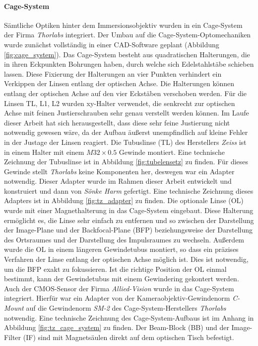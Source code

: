 \documentclass[titlepage,  ngerman]{article}
\begin{document}
	\paragraph{Cage-System}
	Sämtliche Optiken hinter dem Immersionsobjektiv wurden in ein Cage-System der Firma \textit{Thorlabs} integriert. Der Umbau auf die Cage-System-Optomechaniken wurde zunächst vollständig in einer CAD-Software geplant (Abbildung \ref{fig:cage_system}). Das Cage-System besteht aus quadratischen Halterungen, die in ihren Eckpunkten Bohrungen haben, durch welche sich Edelstahlstäbe schieben lassen. Diese Fixierung der Halterungen an vier Punkten verhindert ein Verkippen der Linsen entlang der optischen Achse. Die Halterungen können entlang der optischen Achse auf den vier Eckstäben verschoben werden. Für die  Linsen TL, L1, L2 wurden xy-Halter verwendet, die senkrecht zur optischen Achse mit feinen Justierschrauben sehr genau verstellt werden können. Im Laufe dieser Arbeit hat sich herausgestellt, dass diese sehr feine Justierung nicht notwendig gewesen wäre, da der Aufbau äußerst unempfindlich auf kleine Fehler in der Justage der Linsen reagiert. Die Tubuslinse (TL) des Herstellers \textit{Zeiss} ist in einem Halter mit einem $M32\times0.5$ Gewinde montiert. Eine technische Zeichnung der Tubuslinse ist in Abbildung \ref{fig:tubelensetz} zu finden. Für dieses Gewinde stellt \textit{Thorlabs} keine Komponenten her, deswegen war ein Adapter notwendig. Dieser Adapter wurde im Rahmen dieser Arbeit entwickelt und konstruiert und dann von \textit{Sönke Harm} gefertigt. Eine technische Zeichnung dieses Adapters ist in Abbildung \ref{fig:tz_adapter} zu finden. Die optionale Linse (OL) wurde mit einer Magnethalterung in das Cage-System eingebaut. Diese Halterung ermöglicht es, die Linse sehr einfach zu entfernen und so zwischen der Darstellung der Image-Plane und der Backfocal-Plane (BFP) beziehungsweise der Darstellung des Ortsraumes und der Darstellung des Impulsraumes zu wechseln. Außerdem wurde die OL in einem längeren Gewindetubus montiert, so dass ein präzises Verfahren der Linse entlang der optischen Achse möglich ist. Dies ist notwendig, um die BFP exakt zu fokussieren. Ist die richtige Position der OL einmal bestimmt, kann der Gewindetubus mit einem Gewindering gekontert werden. Auch der CMOS-Sensor der Firma \textit{Allied-Vision} wurde in das Cage-System integriert. Hierfür war ein Adapter von der Kameraobjektiv-Gewindenorm \textit{C-Mount} auf die Gewindenorm \textit{SM-2} des Cage-System-Herstellers \textit{Thorlabs} notwendig. Eine technische Zeichnung des Cage-System-Aufbaus ist im Anhang in Abbildung \ref{fig:tz_cage_system} zu finden. Der Beam-Block (BB) und der Image-Filter (IF) sind mit Magnetsäulen direkt auf dem optischen Tisch befestigt.
\end{document}
